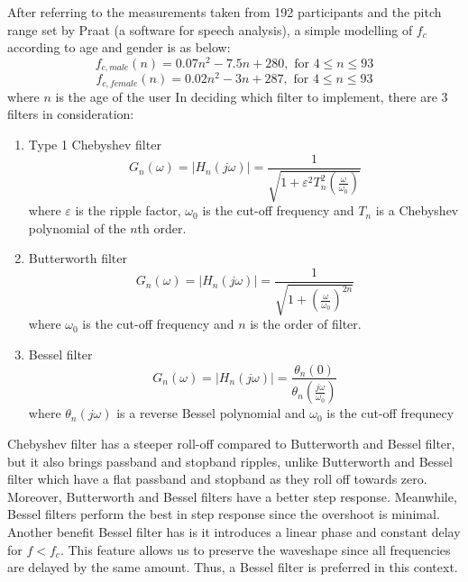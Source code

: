After referring to the measurements taken from 192 participants and the pitch range
set by Praat (a software for speech analysis), a simple modelling of $f_c$ according to age and gender
is as below:
\[f_{c,male}(n) = 0.07n^2 - 7.5n + 280, \text{ for } 4 \leq n\leq 93 \label{male} \] 
\[f_{c,female}(n) = 0.02n^2 - 3n + 287, \text{ for } 4 \leq n \leq 93 \label{female} \] 
where $n$ is the age of the user
In deciding which filter to implement, there are 3 filters in consideration:
\begin{enumerate}[label=(\alph*)]
    \item Type 1 Chebyshev filter
    \[G_{n}(\omega) = |H_{n}(j\omega)| = {\frac{1}{\sqrt{1+\varepsilon^{2} T_{n}^{2}(\frac{\omega}{\omega_{0}})}}}\]
    where $\varepsilon$  is the ripple factor, $\omega _{0}$ is the cut-off frequency
    and $T_{n}$ is a Chebyshev polynomial of the $n$th order.
    \item Butterworth filter
    \[G_{n}(\omega) = |H_{n}(j\omega)| = {\frac{1}{\sqrt{1+(\frac{\omega}{\omega_{0}})^{2n}}}}\]
    where $\omega _{0}$ is the cut-off frequency and $n$ is the order of filter.
    \item Bessel filter
    \[G_{n}(\omega) = |H_{n}(j\omega)| ={\frac {\theta _{n}(0)}{\theta _{n}(\frac{j\omega}{\omega _{0}})}}\]
    where $\theta _{n}(j\omega)$ is a reverse Bessel polynomial and $\omega _{0}$ is the cut-off frequnecy
\end{enumerate}

Chebyshev filter has a steeper roll-off compared to Butterworth and Bessel filter, but it also brings passband and stopband ripples, 
unlike Butterworth and Bessel filter which have a flat passband and stopband as they roll off towards zero. Moreover, Butterworth 
and Bessel filters have a better step response. Meanwhile, Bessel filters perform the best in step response since the overshoot is
minimal. Another benefit Bessel filter has is it introduces a linear phase and constant delay for $f<f_c$. This
feature allows us to preserve the waveshape since all frequencies are delayed by the same amount.
Thus, a Bessel filter is preferred in this context.

